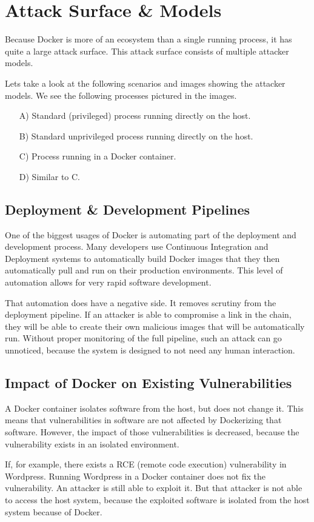 \section{Attack Surface \& Models}
Because Docker is more of an ecosystem than a single running process, it has quite a large attack surface. This attack surface consists of multiple attacker models.

\hfill

Lets take a look at the following scenarios and images showing the attacker models.
We see the following processes pictured in the images.
\begin{enumerate}
    \item[A)] Standard (privileged) process running directly on the host.
    \item[B)] Standard unprivileged process running directly on the host.
    \item[C)] Process running in a Docker container.
    \item[D)] Similar to C.
\end{enumerate}





\subsection{Deployment \& Development Pipelines}
One of the biggest usages of Docker is automating part of the deployment and development process. Many developers use Continuous Integration and Deployment systems to automatically build Docker images that they then automatically pull and run on their production environments. This level of automation allows for very rapid software development.

That automation does have a negative side. It removes scrutiny from the deployment pipeline. If an attacker is able to compromise a link in the chain, they will be able to create their own malicious images that will be automatically run. Without proper monitoring of the full pipeline, such an attack can go unnoticed, because the system is designed to not need any human interaction.

\subsection{Impact of Docker on Existing Vulnerabilities}
A Docker container isolates software from the host, but does not change it. This means that vulnerabilities in software are not affected by Dockerizing that software. However, the impact of those vulnerabilities is decreased, because the vulnerability exists in an isolated environment.

If, for example, there exists a RCE (remote code execution) vulnerability in Wordpress. Running Wordpress in a Docker container does not fix the vulnerability. An attacker is still able to exploit it. But that attacker is not able to access the host system, because the exploited software is isolated from the host system because of Docker.
